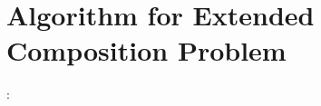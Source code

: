 \documentclass[senior,final,11pt]{iscs-thesis}
\begin{document}









\section{Algorithm for Extended Composition Problem}: %
\end{document}

